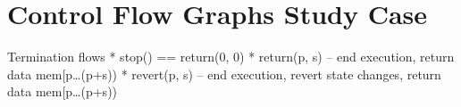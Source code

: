 \chapter*{Control Flow Graphs Study Case} 


Termination flows
* stop() == return(0, 0)
* return(p, s) – end execution, return data mem[p…(p+s))
* revert(p, s) – end execution, revert state changes, return data mem[p…(p+s))
